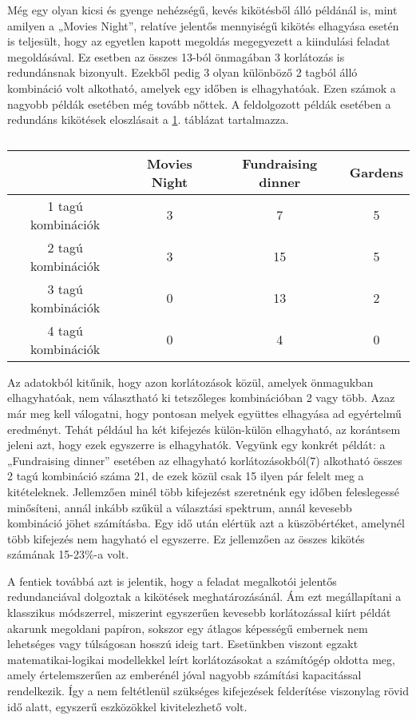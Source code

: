 \documentclass[12pt,a4paper,twoside, openright]{report}
\begin{document}
    Még egy olyan kicsi és gyenge nehézségű, kevés kikötésből álló példánál is, mint amilyen a „Movies Night”, relatíve jelentős mennyiségű kikötés elhagyása esetén is teljesült, hogy az egyetlen kapott megoldás megegyezett a kiindulási feladat megoldásával.
    Ez esetben az összes 13-ból önmagában 3 korlátozás is redundánsnak bizonyult.
    Ezekből pedig 3 olyan különböző 2 tagból álló kombináció volt alkotható, amelyek egy időben is elhagyhatóak.
    Ezen számok a nagyobb példák esetében még tovább nőttek.
    A feldolgozott példák esetében a redundáns kikötések eloszlásait a \ref{elhagyhato}. táblázat tartalmazza.

    
    \begin{table}[h]
    	\centering
    	\caption{}
    	\label{elhagyhato}   
    	\begin{tabular}{|c|c|c|c|}
    		\hline 
    		& Movies Night & Fundraising dinner & Gardens \\ 
    		\hline 
    		1 tagú kombinációk & 3 & 7 & 5 \\ 
    		\hline 
    		2 tagú kombinációk & 3 & 15 & 5 \\ 
    		\hline 
    		3 tagú kombinációk & 0 & 13 & 2 \\ 
    		\hline 
    		4 tagú kombinációk & 0 & 4 & 0 \\ 
    		\hline 
    	\end{tabular} 
    \end{table}
    

    Az adatokból kitűnik, hogy azon korlátozások közül, amelyek önmagukban elhagyhatóak, nem választható ki tetszőleges kombinációban 2 vagy több.
    Azaz már meg kell válogatni, hogy pontosan melyek együttes elhagyása ad egyértelmű eredményt.
    Tehát például ha két kifejezés külön-külön elhagyható, az korántsem jeleni azt, hogy ezek egyszerre is elhagyhatók.
    Vegyünk egy konkrét példát: a „Fundraising dinner” esetében az elhagyható korlátozásokból(7) alkotható összes 2 tagú kombináció száma 21, de ezek közül csak 15 ilyen pár felelt meg a kitételeknek.
    Jellemzően minél több kifejezést szeretnénk egy időben feleslegessé minősíteni, annál inkább szűkül a választási spektrum, annál kevesebb kombináció jöhet számításba.
    Egy idő után elértük azt a küszöbértéket, amelynél több kifejezés nem hagyható el egyszerre.
    Ez jellemzően az összes kikötés számának 15-23\%-a volt.
    
    A fentiek továbbá azt is jelentik, hogy a feladat megalkotói jelentős redundanciával dolgoztak a kikötések meghatározásánál.
    Ám ezt megállapítani a klasszikus módszerrel, miszerint egyszerűen kevesebb korlátozással kiírt példát akarunk megoldani papíron, sokszor egy átlagos képességű embernek nem lehetséges vagy túlságosan hosszú ideig tart.
    Esetünkben viszont egzakt matematikai-logikai modellekkel leírt korlátozásokat a számítógép oldotta meg, amely értelemszerűen az emberénél jóval nagyobb számítási kapacitással rendelkezik.
    Így a nem feltétlenül szükséges kifejezések felderítése viszonylag rövid idő alatt, egyszerű eszközökkel kivitelezhető volt.
    
\end{document}
